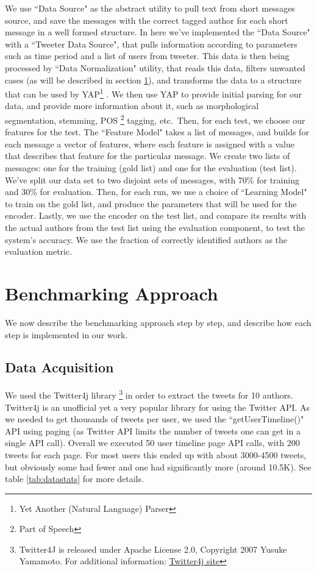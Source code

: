 \documentclass[a4paper]{article}
\begin{document}
We use ``Data Source" as the abstract utility to pull text from short messages source, and save the messages with the correct tagged author for each short message in a well formed structure.
In here we've implemented the ``Data Source" with a ``Tweeter Data Source", that pulls information according to parameters such as time period and a list of users from tweeter.
This data is then being processed by ``Data Normalization" utility, that reads this data, filters unwanted cases (as will be described in section \ref{Approach}), and transforms the data to a structure that can be used by YAP\footnote{Yet Another (Natural Language) Parser} \citep{moretsarfatycoling2016}.
We then use YAP to provide initial parsing for our data, and provide more information about it, such as morphological segmentation, stemming, POS \footnote{Part of Speech} tagging, etc.\
Then, for each test, we choose our features for the test. The ``Feature Model" takes a list of messages, and builds for each message a vector of features, where each feature is assigned with a value that describes that feature for the particular message.
We create two lists of messages: one for the training (gold list) and one for the evaluation (test list). We've split our data set to two disjoint sets of messages, with 70\% for training and 30\% for evaluation.
Then, for each run, we use a choice of ``Learning Model" to train on the gold list, and produce the parameters that will be used for the encoder.
Lastly, we use the encoder on the test list, and compare its results with the actual authors from the test list using the evaluation component, to test the system's accuracy.
We use the fraction of correctly identified authors as the evaluation metric.

\section{Benchmarking Approach}
\label{Approach}

We now describe the benchmarking approach step by step, and describe how each step is implemented in our work.
\subsection{Data Acquisition}

We used the Twitter4j library \footnote{ Twitter4J is released under Apache License 2.0, Copyright 2007 Yusuke Yamamoto. For additional information: \href{http://twitter4j.org/en/index.html}{Twitter4j site}} in order to extract the tweets for 10 authors. Twitter4j is an unofficial yet a very popular library for using the Twitter API. As we needed to get thousands of tweets per user, we used the ``getUserTimeline()" API using paging (as Twitter API limits the number of tweets one can get in a single API call). Overall we executed 50 user timeline page API calls, with 200 tweets for each page. For most users this ended up with about 3000-4500 tweets, but obviously some had fewer and one had significantly more (around 10.5K). See table \ref{tab:datastats} for more details.
\end{document}
